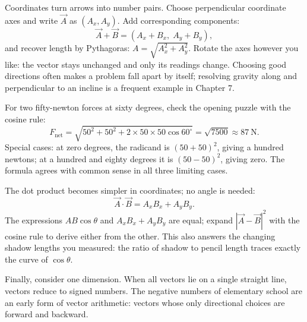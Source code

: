 \begin{mathbridge}
Coordinates turn arrows into number pairs. Choose perpendicular coordinate axes and write \(\vec{A}\) as \((A_x,A_y)\). Add corresponding components:
\[
  \vec{A}+\vec{B} = (A_x+B_x,\;A_y+B_y),
\]
and recover length by Pythagoras: \(A=\sqrt{A_x^2+A_y^2}\). Rotate the axes however you like: the vector stays unchanged and only its readings change. Choosing good directions often makes a problem fall apart by itself; resolving gravity along and perpendicular to an incline is a frequent example in Chapter 7.

For two fifty-newton forces at sixty degrees, check the opening puzzle with the cosine rule:
\[
  F_{\text{net}}=\sqrt{50^{2}+50^{2}+2\times 50\times 50\cos 60^{\circ}}
  =\sqrt{7500}\approx 87\ \text{N}.
\]
Special cases: at zero degrees, the radicand is \((50+50)^2\), giving a hundred newtons; at a hundred and eighty degrees it is \((50-50)^2\), giving zero. The formula agrees with common sense in all three limiting cases.

The dot product becomes simpler in coordinates; no angle is needed:
\[
  \vec{A}\cdot\vec{B} = A_xB_x + A_yB_y .
\]
The expressions \(AB\cos\theta\) and \(A_xB_x+A_yB_y\) are equal; expand \(|\vec{A}-\vec{B}|^2\) with the cosine rule to derive either from the other. This also answers the changing shadow lengths you measured: the ratio of shadow to pencil length traces exactly the curve of \(\cos\theta\).

Finally, consider one dimension. When all vectors lie on a single straight line, vectors reduce to signed numbers. The negative numbers of elementary school are an early form of vector arithmetic: vectors whose only directional choices are forward and backward.
\end{mathbridge}

